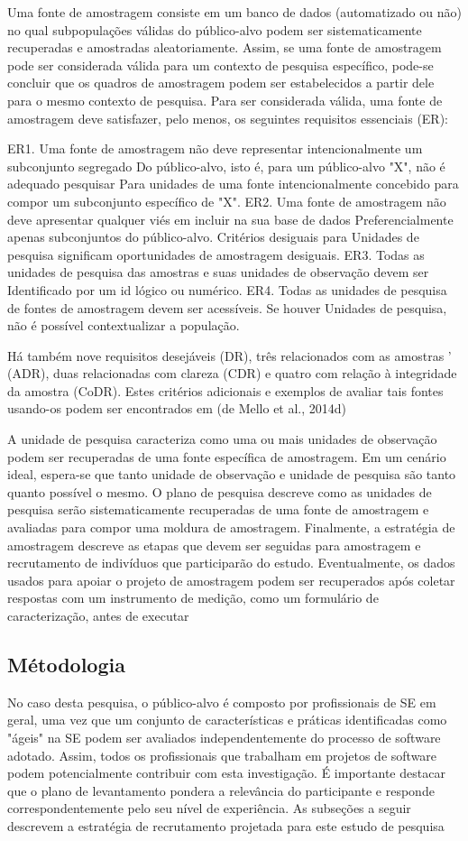 Uma fonte de amostragem consiste em um banco de dados (automatizado ou não) no
qual subpopulações válidas do público-alvo podem ser sistematicamente
recuperadas e amostradas aleatoriamente. Assim, se uma fonte de amostragem pode
ser considerada válida para um contexto de pesquisa específico, pode-se concluir
que os quadros de amostragem podem ser estabelecidos a partir dele para o mesmo
contexto de pesquisa. Para ser considerada válida, uma fonte de amostragem deve
satisfazer, pelo menos, os seguintes requisitos essenciais (ER):

ER1. Uma fonte de amostragem não deve representar intencionalmente um
subconjunto segregado Do público-alvo, isto é, para um público-alvo "X", não é
adequado pesquisar Para unidades de uma fonte intencionalmente concebido para
compor um subconjunto específico de "X".
ER2. Uma fonte de amostragem não deve apresentar qualquer viés em incluir na sua
base de dados Preferencialmente apenas subconjuntos do público-alvo. Critérios
desiguais para Unidades de pesquisa significam oportunidades de amostragem
desiguais.
ER3. Todas as unidades de pesquisa das amostras e suas unidades de observação
devem ser Identificado por um id lógico ou numérico.
ER4. Todas as unidades de pesquisa de fontes de amostragem devem ser acessíveis.
Se houver Unidades de pesquisa, não é possível contextualizar a população.

Há também nove requisitos desejáveis (DR), três relacionados com as amostras '
(ADR), duas relacionadas com clareza (CDR) e quatro com relação à integridade da
amostra (CoDR). Estes critérios adicionais e exemplos de avaliar tais fontes
usando-os podem ser encontrados em (de Mello et al., 2014d)

A unidade de pesquisa caracteriza como uma ou mais unidades de observação podem
ser recuperadas de uma fonte específica de amostragem. Em um cenário ideal,
espera-se que tanto unidade de observação e unidade de pesquisa são tanto quanto
possível o mesmo. O plano de pesquisa descreve como as unidades de pesquisa
serão sistematicamente recuperadas de uma fonte de amostragem e avaliadas para
compor uma moldura de amostragem. Finalmente, a estratégia de amostragem
descreve as etapas que devem ser seguidas para amostragem e recrutamento de
indivíduos que participarão do estudo. Eventualmente, os dados usados para
apoiar o projeto de amostragem podem ser recuperados após coletar respostas com
um instrumento de medição, como um formulário de caracterização, antes de
executar
\subsection{Métodologia}
No caso desta pesquisa, o público-alvo é composto por profissionais de SE em
geral, uma vez que um conjunto de características e práticas identificadas como
"ágeis" na SE podem ser avaliados independentemente do processo de software
adotado. Assim, todos os profissionais que trabalham em projetos de software
podem potencialmente contribuir com esta investigação. É importante destacar que
o plano de levantamento pondera a relevância do participante e responde
correspondentemente pelo seu nível de experiência. As subseções a seguir
descrevem a estratégia de recrutamento projetada para este estudo de pesquisa

